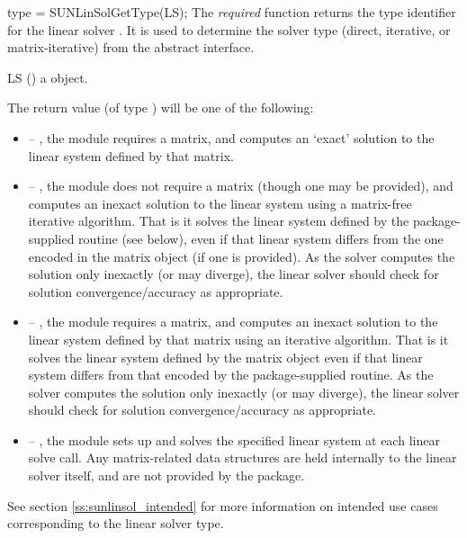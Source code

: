 {
  type = SUNLinSolGetType(LS);
}
{
  The \textit{required} function  returns the
  type identifier for the linear solver . It is used to
  determine the solver type (direct, iterative, or matrix-iterative) from
  the abstract  interface.
}
{
  \begin{args}[LS]
  \item[LS] ()
    a {\sunlinsol} object.
  \end{args}
}
{
  The return value  (of type ) will be one of the
  following:
  \begin{itemize}
  \item {} -- , the {\sunlinsol} module requires
  a matrix, and computes an `exact' solution to the linear system defined by
  that matrix.
  \item {} -- , the {\sunlinsol} module does
  not require a matrix (though one may be provided), and computes an inexact
  solution to the linear system using a matrix-free iterative algorithm. That is
  it solves the linear system defined by the package-supplied 
  routine (see  below), even if that linear
  system differs from the one encoded in the matrix object (if one is
  provided). As the solver computes the solution only inexactly (or may
  diverge), the linear solver should check for solution convergence/accuracy as
  appropriate.
  \item {} -- , the {\sunlinsol}
  module requires a matrix, and computes an inexact solution to the linear
  system defined by that matrix using an iterative algorithm. That is it solves
  the linear system defined by the matrix object even if that linear system
  differs from that encoded by the package-supplied  routine. As the
  solver computes the solution only inexactly (or may diverge), the linear
  solver should check for solution convergence/accuracy as appropriate.
  \item {} -- , the {\sunlinsol} module sets up
  and solves the specified linear system at each linear solve call.  Any
  matrix-related data structures are held internally to the linear solver itself,
  and are not provided by the {\sundials} package.
  \end{itemize}
}
{
 See section \ref{ss:sunlinsol_intended} for more information on intended use
 cases corresponding to the linear solver type.
}
